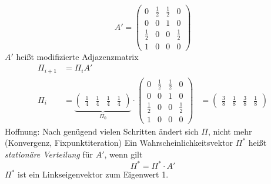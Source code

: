 \[
A' = \begin{pmatrix}
 0 & \frac{1}{2} & \frac{1}{2} & 0 \\
 0 & 0 & 1 & 0 \\
 \frac{1}{2} & 0 & 0 & \frac{1}{2} \\
 1 & 0 & 0 & 0
\end{pmatrix}
\]
$A'$ heißt modifizierte Adjazenzmatrix
\begin{align*}
 \Pi_{i+1} &= \Pi_i A' \\
 \Pi_i &= \underbrace{\begin{pmatrix}\frac{1}{4} & \frac{1}{4} & \frac{1}{4} & \frac{1}{4}\end{pmatrix}}_{\Pi_0} \cdot
 \begin{pmatrix}
 0 & \frac{1}{2} & \frac{1}{2} & 0 \\
 0 & 0 & 1 & 0 \\
 \frac{1}{2} & 0 & 0 & \frac{1}{2} \\
 1 & 0 & 0 & 0
\end{pmatrix}
 &= \begin{pmatrix}\frac{3}{8} & \frac{1}{8} & \frac{3}{8} & \frac{1}{8}\end{pmatrix}
\end{align*}
Hoffnung: Nach genügend vielen Schritten ändert sich $\Pi$, nicht mehr (Konvergenz, Fixpunktiteration)
\Defi Ein Wahrscheinlichkeitsvektor $\Pi^*$ heißt \emph{stationäre Verteilung} für $A'$, wenn gilt
    \[\Pi^* = \Pi^* \cdot A'\]
    $\Pi^*$ ist ein Linkseigenvektor zum Eigenwert 1.

